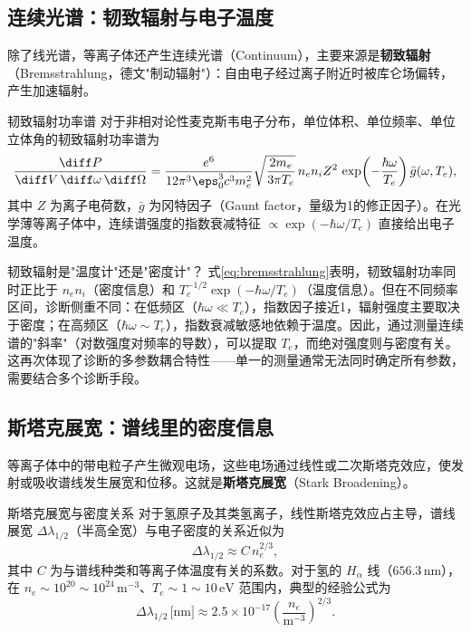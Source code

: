 \subsection{连续光谱：韧致辐射与电子温度}

除了线光谱，等离子体还产生连续光谱（Continuum），主要来源是\textbf{韧致辐射}（Bremsstrahlung，德文"制动辐射"）：自由电子经过离子附近时被库仑场偏转，产生加速辐射。

\begin{theorem}{韧致辐射功率谱}{}{}
对于非相对论性麦克斯韦电子分布，单位体积、单位频率、单位立体角的韧致辐射功率谱为
\begin{equation}
\frac{\diff P}{\diff V\,\diff\omega\,\diff\Omega} = \frac{e^6}{12\pi^3\eps_0^3 c^3 m_e^2}\sqrt{\frac{2m_e}{3\pi T_e}}\,n_e n_i Z^2\,\exp\!\left(-\frac{\hbar\omega}{T_e}\right) \bar{g}(\omega, T_e),
\label{eq:bremsstrahlung}
\end{equation}
其中 $Z$ 为离子电荷数，$\bar{g}$ 为冈特因子（Gaunt factor，量级为1的修正因子）。在光学薄等离子体中，连续谱强度的指数衰减特征 $\propto \exp(-\hbar\omega/T_e)$ 直接给出电子温度。
\end{theorem}

\begin{insight}{韧致辐射是"温度计"还是"密度计"？}{}{}
式\eqref{eq:bremsstrahlung}表明，韧致辐射功率同时正比于 $n_e n_i$（密度信息）和 $T_e^{-1/2}\exp(-\hbar\omega/T_e)$（温度信息）。但在不同频率区间，诊断侧重不同：在低频区（$\hbar\omega \ll T_e$），指数因子接近1，辐射强度主要取决于密度；在高频区（$\hbar\omega \sim T_e$），指数衰减敏感地依赖于温度。因此，通过测量连续谱的"斜率"（对数强度对频率的导数），可以提取 $T_e$，而绝对强度则与密度有关。这再次体现了诊断的多参数耦合特性——单一的测量通常无法同时确定所有参数，需要结合多个诊断手段。
\end{insight}

\subsection{斯塔克展宽：谱线里的密度信息}

等离子体中的带电粒子产生微观电场，这些电场通过线性或二次斯塔克效应，使发射或吸收谱线发生展宽和位移。这就是\textbf{斯塔克展宽}（Stark Broadening）。

\begin{definition}{斯塔克展宽与密度关系}{}{}
对于氢原子及其类氢离子，线性斯塔克效应占主导，谱线展宽 $\Delta\lambda_{1/2}$（半高全宽）与电子密度的关系近似为
\begin{equation}
\Delta\lambda_{1/2} \approx C\,n_e^{2/3},
\label{eq:stark-broadening}
\end{equation}
其中 $C$ 为与谱线种类和等离子体温度有关的系数。对于氢的 $H_\alpha$ 线（$656.3\,\mathrm{nm}$），在 $n_e \sim 10^{20}\sim 10^{24}\,\mathrm{m}^{-3}$、$T_e \sim 1\sim 10\,\mathrm{eV}$ 范围内，典型的经验公式为
\begin{equation}
\Delta\lambda_{1/2}\,\big[\mathrm{nm}\big] \approx 2.5\times 10^{-17}\left(\frac{n_e}{\mathrm{m}^{-3}}\right)^{2/3}.
\end{equation}
\end{definition}

